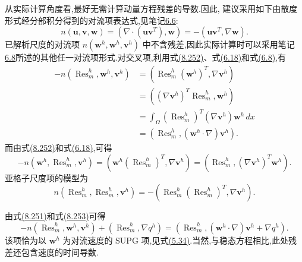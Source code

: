\begin{note}[三线性对流项]
\label{note:vms-trilinear-convection-terms}
从实际计算角度看,最好无需计算动量方程残差的导数.因此,\textcite{Bazilevs2007} 建议采用如下由散度形式经分部积分得到的对流项表达式,见笔记\hyperref[note:steady-ns-convection-forms]{6.6}:
\begin{equation}\label{eq:vms-convection-divergence-form}
 n(\bm{u},\bm{v},\bm{w})
 =(\nabla\cdot(\bm{u}\bm{v}^{T}),\bm{w})
 =-(\bm{u}\bm{v}^{T},\nabla\bm{w}).
\end{equation}
已解析尺度的对流项 $n(\bm{w}^h,\bm{w}^h,\bm{v}^h)$ 中不含残差,因此实际计算时可以采用笔记\hyperref[note:steady-ns-equivalent-variational-forms]{6.8}所述的其他任一对流项形式.对交叉项,利用式\hyperref[eq:vms-convection-divergence-form]{(8.252)}、式\hyperref[eq:steady-ns-rot-conv-inner-product]{(6.18)}和式\hyperref[eq:steady-ns-convection-gradient]{(6.8)},有
\begin{equation}\label{eq:vms-momentum-cross-term-one}
\begin{aligned}
 -n(\operatorname{Res}_m^h,\bm{w}^h,\bm{v}^h)
 &= (\operatorname{Res}_m^h(\bm{w}^h)^T,\nabla\bm{v}^h)\\
 &=((\nabla\bm{v}^h)^T\operatorname{Res}_m^h,\bm{w}^h)\\
 &=\int_\Omega(\operatorname{Res}_m^h)^T(\nabla\bm{v}^h)\bm{w}^h\,dx\\
 &=(\operatorname{Res}_m^h,(\bm{w}^h\cdot\nabla)\bm{v}^h).
\end{aligned}
\end{equation}
而由式\hyperref[eq:vms-convection-divergence-form]{(8.252)}和式\hyperref[eq:steady-ns-rot-conv-inner-product]{(6.18)},可得
\begin{equation}\label{eq:vms-momentum-cross-term-two}
 -n(\bm{w}^h,\operatorname{Res}_m^h,\bm{v}^h)
 =(\bm{w}^h(\operatorname{Res}_m^h)^T,\nabla\bm{v}^h)
 =(\operatorname{Res}_m^h,(\nabla\bm{v}^h)^T\bm{w}^h).
\end{equation}
亚格子尺度项的模型为
\begin{equation}\label{eq:vms-subgrid-scale-convection-term}
 n(\operatorname{Res}_m^h,\operatorname{Res}_m^h,\bm{v}^h)
 =-(\operatorname{Res}_m^h(\operatorname{Res}_m^h)^T,\nabla\bm{v}^h).
\end{equation}
\end{note}

\begin{note}[SUPG 项]
\label{note:vms-supg-term}
由式\hyperref[eq:vms-residual-based-resolved-formulation]{(8.251)}和式\hyperref[eq:vms-momentum-cross-term-one]{(8.253)}可得
\[
 -n(\operatorname{Res}_m^h,\bm{w}^h,\bm{v}^h)
 +(\operatorname{Res}_m^h,\nabla q^h)
 =(\operatorname{Res}_m^h,(\bm{w}^h\cdot\nabla)\bm{v}^h+\nabla q^h).
\]
该项恰为以 $\bm{w}^h$ 为对流速度的 SUPG 项,见式\hyperref[eq:oseen-spg-bilinear-form]{(5.34)}.当然,与稳态方程相比,此处残差还包含速度的时间导数.
\end{note}

